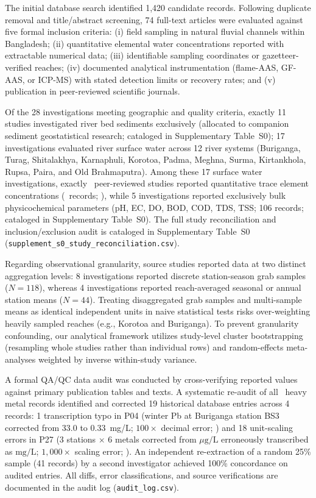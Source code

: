\documentclass[authoryear,preprint,12pt]{elsarticle}
\begin{document}
The initial database search identified 1,420 candidate records. Following duplicate removal and title/abstract screening, 74 full-text articles were evaluated against five formal inclusion criteria: (i) field sampling in natural fluvial channels within Bangladesh; (ii) quantitative elemental water concentrations reported with extractable numerical data; (iii) identifiable sampling coordinates or gazetteer-verified reaches; (iv) documented analytical instrumentation (flame-AAS, GF-AAS, or ICP-MS) with stated detection limits or recovery rates; and (v) publication in peer-reviewed scientific journals. 

Of the 28 investigations meeting geographic and quality criteria, exactly 11 studies investigated river bed sediments exclusively (allocated to companion sediment geostatistical research; cataloged in Supplementary Table~S0); 17 investigations evaluated river surface water across 12 river systems (Buriganga, Turag, Shitalakhya, Karnaphuli, Korotoa, Padma, Meghna, Surma, Kirtankhola, Rupsa, Paira, and Old Brahmaputra). Among these 17 surface water investigations, exactly \TotalMetalStudies\ peer-reviewed studies reported quantitative trace element concentrations (\TotalMetalRecords\ records; \citealt{Bhuiyan2015,Islam2015,Ali2016,Baki2019,Hossain2021,Islam2021,Khatun2021,Ali2021,Proshad2020,Proshad2021,Mortuza2024,Hasan2024}), while 5 investigations reported exclusively bulk physicochemical parameters (pH, EC, DO, BOD, COD, TDS, TSS; 106 records; cataloged in Supplementary Table~S0). The full study reconciliation and inclusion/exclusion audit is cataloged in Supplementary Table~S0 (\texttt{supplement\_s0\_study\_reconciliation.csv}).

Regarding observational granularity, source studies reported data at two distinct aggregation levels: 8 investigations reported discrete station-season grab samples ($N=118$), whereas 4 investigations reported reach-averaged seasonal or annual station means ($N=44$). Treating disaggregated grab samples and multi-sample means as identical independent units in naive statistical tests risks over-weighting heavily sampled reaches (e.g., Korotoa and Buriganga). To prevent granularity confounding, our analytical framework utilizes study-level cluster bootstrapping (resampling whole studies rather than individual rows) and random-effects meta-analyses weighted by inverse within-study variance.

A formal QA/QC data audit was conducted by cross-verifying reported values against primary publication tables and texts. A systematic re-audit of all \TotalMetalRecords\ heavy metal records identified and corrected 19 historical database entries across 4 records: 1 transcription typo in P04 (winter Pb at Buriganga station BS3 corrected from 33.0 to 0.33~mg/L; $100\times$ decimal error; \citealt{Hossain2021}) and 18 unit-scaling errors in P27 (3 stations $\times$ 6 metals corrected from $\mu\text{g/L}$ erroneously transcribed as $\text{mg/L}$; $1,000\times$ scaling error; \citealt{Mortuza2024}). An independent re-extraction of a random 25\% sample (41 records) by a second investigator achieved 100\% concordance on audited entries. All diffs, error classifications, and source verifications are documented in the audit log (\texttt{audit\_log.csv}).
\end{document}
